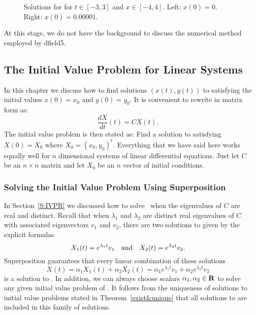 \documentclass{ximera}
\begin{document}
\begin{figure}[htb]
        \centerline{%
	}
        \caption{Solutions for \protect{}
              for $t\in [-3,3]$ and $x\in [-4,4]$. Left: $x(0)=0$.
	      Right: $x(0)=0.00001$.}
        \label{nonuniquefig}
\end{figure}

At this stage, we do not have the background to discuss the numerical
method employed by {\sf dfield5}.

\subsection*{The Initial Value Problem for Linear Systems}

In this chapter we discuss how to find solutions $(x(t),y(t))$ to
 satisfying the initial values $x(0)=x_0$ and $y(0)=y_0$.
It is convenient to rewrite  in matrix form as:
\begin{equation} \label{ndlinsystem}
\frac{dX}{dt}(t) = CX(t).
\end{equation}
The initial value problem is then stated as:  Find a solution to
 satisfying $X(0)=X_0$ where $X_0=(x_0,y_0)^t$.
Everything that we have said here works equally well for $n$
dimensional systems of linear differential equations.  Just let
$C$ be an $n\times n$ matrix and let $X_0$ be an $n$ vector
of initial conditions.

\subsubsection*{Solving the Initial Value Problem Using Superposition}

In Section~\ref{S:IVPR} we discussed how to solve~ when the
eigenvalues of $C$ are real and distinct.  Recall that when $\lambda_1$ and
$\lambda_2$ are distinct real eigenvalues of $C$ with associated
eigenvectors $v_1$ and $v_2$, there are two solutions to 
given by the explicit formulas
\[
X_1(t) = e^{\lambda_1 t}v_1 \quad\mbox{and}\quad X_2(t) = e^{\lambda_2 t}v_2.
\]
Superposition guarantees that every linear combination of these solutions
\[
X(t) = \alpha_1X_1(t)+\alpha_2X_2(t) =
\alpha_1e^{\lambda_1 t}v_1 + \alpha_2e^{\lambda_2 t}v_2
\]
is a solution to .  In addition, we can always choose
scalars $\alpha_1,\alpha_2\in\mbox{$\bf{R}$}$ to solve any given initial value problem
of .   It follows from the uniqueness of solutions to
initial value problems stated in Theorem~\ref{exist&unique} that all
solutions to  are included in this family of solutions.
\end{document}
